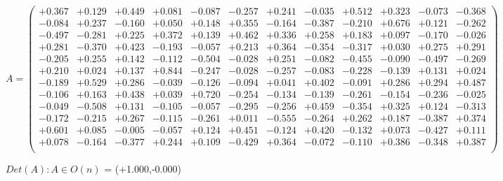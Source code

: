 \documentclass[9pt]{article}
\theoremstyle{plain}
\theoremstyle{definition}
\theoremstyle{remark}
\numberwithin{equation}{section}
\begin{document}
$A = \left(
\begin{array}{
cccccccccccc}
+0.367 & +0.129 & +0.449 & +0.081 & -0.087 & -0.257 & +0.241 & -0.035 & +0.512 & +0.323 & -0.073 & -0.368 \\
-0.084 & +0.237 & -0.160 & +0.050 & +0.148 & +0.355 & -0.164 & -0.387 & -0.210 & +0.676 & +0.121 & -0.262 \\
-0.497 & -0.281 & +0.225 & +0.372 & +0.139 & +0.462 & +0.336 & +0.258 & +0.183 & +0.097 & -0.170 & -0.026 \\
+0.281 & -0.370 & +0.423 & -0.193 & -0.057 & +0.213 & +0.364 & -0.354 & -0.317 & +0.030 & +0.275 & +0.291 \\
-0.205 & +0.255 & +0.142 & -0.112 & -0.504 & -0.028 & +0.251 & -0.082 & -0.455 & -0.090 & -0.497 & -0.269 \\
+0.210 & +0.024 & +0.137 & +0.844 & -0.247 & -0.028 & -0.257 & -0.083 & -0.228 & -0.139 & +0.131 & +0.024 \\
-0.189 & +0.529 & +0.286 & -0.039 & -0.126 & -0.094 & +0.041 & +0.402 & -0.091 & +0.286 & +0.294 & +0.487 \\
-0.106 & +0.163 & +0.438 & +0.039 & +0.720 & -0.254 & -0.134 & -0.139 & -0.261 & -0.154 & -0.236 & -0.025 \\
-0.049 & -0.508 & +0.131 & -0.105 & -0.057 & -0.295 & -0.256 & +0.459 & -0.354 & +0.325 & +0.124 & -0.313 \\
-0.172 & -0.215 & +0.267 & -0.115 & -0.261 & +0.011 & -0.555 & -0.264 & +0.262 & +0.187 & -0.387 & +0.374 \\
+0.601 & +0.085 & -0.005 & -0.057 & +0.124 & +0.451 & -0.124 & +0.420 & -0.132 & +0.073 & -0.427 & +0.111 \\
+0.078 & -0.164 & -0.377 & +0.244 & +0.109 & -0.429 & +0.364 & -0.072 & -0.110 & +0.386 & -0.348 & +0.387 \\
\end{array}
\right)$ \newline 

$Det(A) :   A \in O(n)$ = (+1.000,-0.000)
\end{document}
